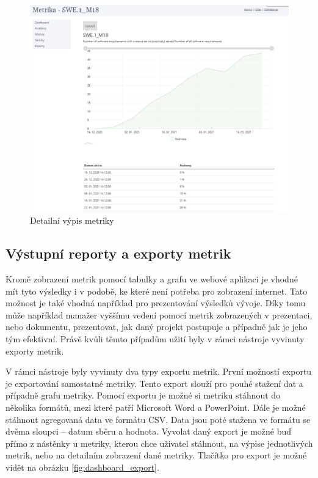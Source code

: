 \documentclass[czech,master,public,dept460,male,cpdeclaration,oneside]{diploma}
\begin{document}
\begin{figure}[!ht]
    \centering
    \includegraphics[width=1\textwidth]{Diplomka/Figures/metric_detail.png}
    \caption{Detailní výpis metriky}
    \label{fig:metric_detail}
\end{figure}


\subsection{Výstupní reporty a exporty metrik}
Kromě zobrazení metrik pomocí tabulky a grafu ve webové aplikaci je vhodné mít tyto výsledky i v podobě, ke které není potřeba pro zobrazení internet. Tato možnost je také vhodná například pro prezentování výsledků vývoje. Díky tomu může například manažer vyššímu vedení pomocí metrik zobrazených v prezentaci, nebo dokumentu, prezentovat, jak daný projekt postupuje a případně jak je jeho tým efektivní. Právě kvůli těmto případům užití byly v rámci nástroje vyvinuty exporty metrik.

V rámci nástroje byly vyvinuty dva typy exportu metrik. První možností exportu je exportování samostatné metriky. Tento export slouží pro pouhé stažení dat a případně grafu metriky. Pomocí exportu je možné si metriku stáhnout do několika formátů, mezi které patří Microsoft Word a PowerPoint. Dále je možné stáhnout agregovaná data ve formátu CSV. Data jsou poté stažena ve formátu se dvěma sloupci -- datum sběru a hodnota. Vyvolat daný export je možné buď přímo z nástěnky u metriky, kterou chce uživatel stáhnout, na výpise jednotlivých metrik, nebo na detailním zobrazení dané metriky. Tlačítko pro export je možné vidět na obrázku \ref{fig:dashboard_export}.
\end{document}
